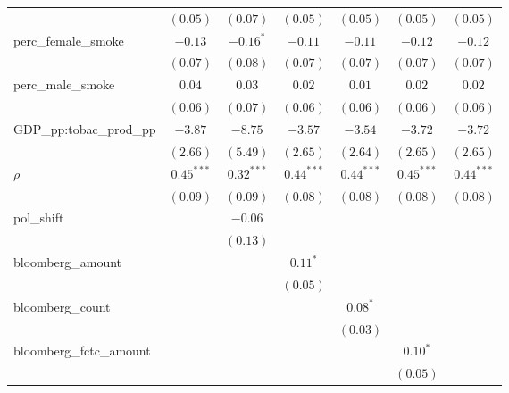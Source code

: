 \begin{table}[!h]
\begin{center}
\begin{tabular}{l c c c c c c }
                        & $(0.05)$     & $(0.07)$     & $(0.05)$     & $(0.05)$     & $(0.05)$     & $(0.05)$     \\
perc\_female\_smoke     & $-0.13$      & $-0.16^{*}$  & $-0.11$      & $-0.11$      & $-0.12$      & $-0.12$      \\
                        & $(0.07)$     & $(0.08)$     & $(0.07)$     & $(0.07)$     & $(0.07)$     & $(0.07)$     \\
perc\_male\_smoke       & $0.04$       & $0.03$       & $0.02$       & $0.01$       & $0.02$       & $0.02$       \\
                        & $(0.06)$     & $(0.07)$     & $(0.06)$     & $(0.06)$     & $(0.06)$     & $(0.06)$     \\
GDP\_pp:tobac\_prod\_pp & $-3.87$      & $-8.75$      & $-3.57$      & $-3.54$      & $-3.72$      & $-3.72$      \\
                        & $(2.66)$     & $(5.49)$     & $(2.65)$     & $(2.64)$     & $(2.65)$     & $(2.65)$     \\
$\rho$                  & $0.45^{***}$ & $0.32^{***}$ & $0.44^{***}$ & $0.44^{***}$ & $0.45^{***}$ & $0.44^{***}$ \\
                        & $(0.09)$     & $(0.09)$     & $(0.08)$     & $(0.08)$     & $(0.08)$     & $(0.08)$     \\
pol\_shift              &              & $-0.06$      &              &              &              &              \\
                        &              & $(0.13)$     &              &              &              &              \\
bloomberg\_amount       &              &              & $0.11^{*}$   &              &              &              \\
                        &              &              & $(0.05)$     &              &              &              \\
bloomberg\_count        &              &              &              & $0.08^{*}$   &              &              \\
                        &              &              &              & $(0.03)$     &              &              \\
bloomberg\_fctc\_amount &              &              &              &              & $0.10^{*}$   &              \\
                        &              &              &              &              & $(0.05)$     &              \\

\end{tabular}
\end{center}
\end{table}
